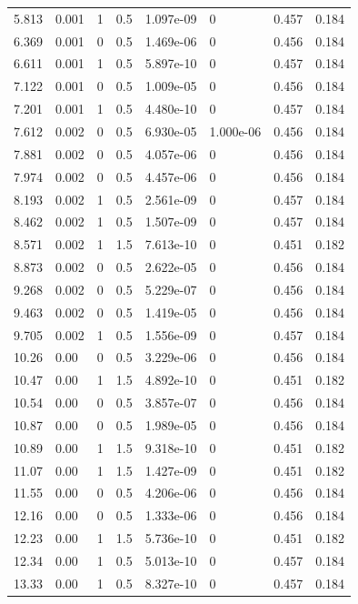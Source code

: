\documentclass[preview]{standalone}
\begin{document}
{{\begin{tabular}{L{1.2cm}C{1.2cm} C{0.3cm}C{0.5cm} C{1.4cm}C{1.4cm} C{1.4cm}C{1.4cm}}
  5.813  &  0.001  & 1     & 0.5 &  1.097e-09  & 0  & 0.457 &  0.184   \\ 
  6.369  &  0.001  & 0     & 0.5 &  1.469e-06  & 0  & 0.456 &  0.184   \\ 
  6.611  &  0.001  & 1     & 0.5 &  5.897e-10  & 0  & 0.457 &  0.184   \\ 
  7.122  &  0.001  & 0     & 0.5 &  1.009e-05  & 0  & 0.456 &  0.184   \\ 
  7.201  &  0.001  & 1     & 0.5 &  4.480e-10  & 0  & 0.457 &  0.184   \\ 
  7.612  &  0.002  & 0     & 0.5 &  6.930e-05  & 1.000e-06  & 0.456 &  0.184   \\ 
  7.881  &  0.002  & 0     & 0.5 &  4.057e-06  & 0  & 0.456 &  0.184   \\ 
  7.974  &  0.002  & 0     & 0.5 &  4.457e-06  & 0  & 0.456 &  0.184   \\ 
  8.193  &  0.002  & 1     & 0.5 &  2.561e-09  & 0  & 0.457 &  0.184   \\ 
  8.462  &  0.002  & 1     & 0.5 &  1.507e-09  & 0  & 0.457 &  0.184   \\ 
  8.571  &  0.002  & 1     & 1.5 &  7.613e-10  & 0  & 0.451 &  0.182   \\ 
  8.873  &  0.002  & 0     & 0.5 &  2.622e-05  & 0  & 0.456 &  0.184   \\ 
  9.268  &  0.002  & 0     & 0.5 &  5.229e-07  & 0  & 0.456 &  0.184   \\ 
  9.463  &  0.002  & 0     & 0.5 &  1.419e-05  & 0  & 0.456 &  0.184   \\ 
  9.705  &  0.002  & 1     & 0.5 &  1.556e-09  & 0  & 0.457 &  0.184   \\ 
  10.26  &  0.00  & 0     & 0.5 &  3.229e-06  & 0  & 0.456 &  0.184   \\ 
  10.47  &  0.00  & 1     & 1.5 &  4.892e-10  & 0  & 0.451 &  0.182   \\ 
  10.54  &  0.00  & 0     & 0.5 &  3.857e-07  & 0  & 0.456 &  0.184   \\ 
  10.87  &  0.00  & 0     & 0.5 &  1.989e-05  & 0  & 0.456 &  0.184   \\ 
  10.89  &  0.00  & 1     & 1.5 &  9.318e-10  & 0  & 0.451 &  0.182   \\ 
  11.07  &  0.00  & 1     & 1.5 &  1.427e-09  & 0  & 0.451 &  0.182   \\ 
  11.55  &  0.00  & 0     & 0.5 &  4.206e-06  & 0  & 0.456 &  0.184   \\ 
  12.16  &  0.00  & 0     & 0.5 &  1.333e-06  & 0  & 0.456 &  0.184   \\ 
  12.23  &  0.00  & 1     & 1.5 &  5.736e-10  & 0  & 0.451 &  0.182   \\ 
  12.34  &  0.00  & 1     & 0.5 &  5.013e-10  & 0  & 0.457 &  0.184   \\ 
  13.33  &  0.00  & 1     & 0.5 &  8.327e-10  & 0  & 0.457 &  0.184   \\ 
\hline 
\end{tabular} 

}}
\end{document}
